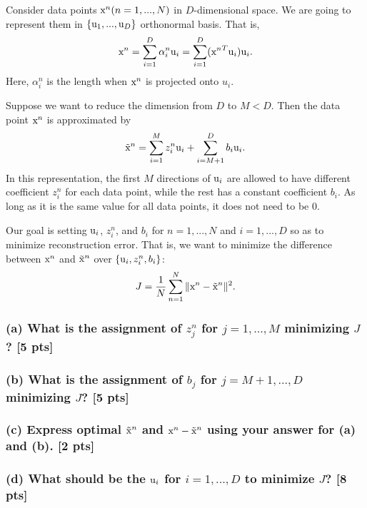 \documentclass[twoside,10pt]{article}
\begin{document}
Consider data points $\text x^n (n=1, ..., N)$ in $D$-dimensional space.
We are going to represent them in $\{\text u_1, ..., \text u_D\}$ orthonormal basis.
That is,
\begin{equation} \nonumber
\text x^n = \sum_{i=1}^D \alpha_i^n \text u_i = \sum_{i=1}^D ({\text x^n}^T \text u_i) \text u_i.
\end{equation}
Here, $\alpha^n_i$ is the length when $\text x^n$ is projected onto
$u_i$.

Suppose we want to reduce the dimension from $D$ to $M < D$. Then
the data point $\text x^n$ is approximated by
\begin{equation} \nonumber
\tilde{\text x}^n = \sum_{i=1}^M z_i^n \text u_i + \sum_{i=M+1}^D b_i \text u_i.
\end{equation}
In this representation, the first $M$ directions of $\text u_i$ are
allowed to have different coefficient $z^n_i$ for each data point,
while the rest has a constant coefficient $b_i$. As long as it is
the same value for all data points, it does not need to be 0.

Our goal is setting $\text u_i$, $z^n_i$, and $b_i$ for $n = 1,..., N$
and $i = 1, ..., D$ so as to minimize reconstruction error. That is,
we want to minimize the difference between $\text x^n$ and $\tilde{\text x}^n$ over $\{ \text u_i, z^n_i, b_i \}$:
\begin{equation} \nonumber
J = \frac{1}{N} \sum_{n=1}^N \| \text x^n - \tilde{\text x}^n \|^2.
\end{equation}

\subsubsection*{(a) What is the assignment of $z_j^n$ for $j=1, ..., M$ minimizing $J$? [5 pts]}
\subsubsection*{(b) What is the assignment of $b_j$ for $j=M+1, ..., D$ minimizing $J$? [5 pts]}
\subsubsection*{(c) Express optimal $\tilde{\text x}^n$ and $\text x^n - \tilde{\text x}^n$ using your answer for (a) and (b). [2 pts]}
\subsubsection*{(d) What should be the $\text u_i$ for $i=1, ..., D$ to minimize $J$? [8 pts]}
\end{document}

